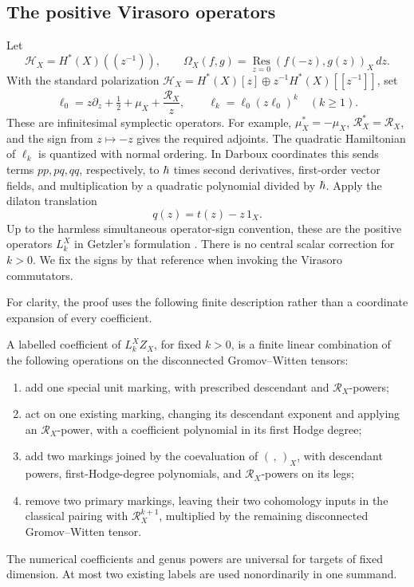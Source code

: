\subsection{The positive Virasoro operators}

Let
\[
 \mathcal H_X=H^*(X)((z^{-1})),\qquad
 \Omega_X(f,g)=\operatorname*{Res}_{z=0}(f(-z),g(z))_X\,dz.
\]
With the standard polarization
\(\mathcal H_X=H^*(X)[z]\oplus z^{-1}H^*(X)[[z^{-1}]]\), set
\begin{equation}
 \ell_0=z\partial_z+\tfrac12+\mu_X+\frac{\mathcal R_X}{z},
 \qquad
 \ell_k=\ell_0(z\ell_0)^k\quad(k\geq1).
 \label{eq:loop-operators}
\end{equation}
These are infinitesimal symplectic operators. For example,
\(\mu_X^*=-\mu_X\), \(\mathcal R_X^*=\mathcal R_X\), and the sign from \(z\mapsto-z\) gives the required adjoints. The quadratic Hamiltonian of \(\ell_k\) is quantized with normal ordering. In Darboux coordinates this sends terms \(pp,pq,qq\), respectively, to \(\hbar\) times second derivatives, first-order vector fields, and multiplication by a quadratic polynomial divided by \(\hbar\). Apply the dilaton translation
\[
 q(z)=t(z)-z\,1_X.
\]
Up to the harmless simultaneous operator-sign convention, these are the positive operators \(L_k^X\) in Getzler's formulation \cite[Equation~(1.2)]{Getzler1999}. There is no central scalar correction for \(k>0\). We fix the signs by that reference when invoking the Virasoro commutators.

For clarity, the proof uses the following finite description rather than a coordinate expansion of every coefficient.

\begin{proposition}\label{conv:positive-rule}
A labelled coefficient of \(L_k^XZ_X\), for fixed \(k>0\), is a finite linear combination of the following operations on the disconnected Gromov--Witten tensors:
\begin{enumerate}[label=\textup{(\roman*)}]
\item add one special unit marking, with prescribed descendant and \(\mathcal R_X\)-powers;
\item act on one existing marking, changing its descendant exponent and applying an \(\mathcal R_X\)-power, with a coefficient polynomial in its first Hodge degree;
\item add two markings joined by the coevaluation of \((\, ,\,)_X\), with descendant powers, first-Hodge-degree polynomials, and \(\mathcal R_X\)-powers on its legs;
\item remove two primary markings, leaving their two cohomology inputs in the classical pairing with \(\mathcal R_X^{k+1}\), multiplied by the remaining disconnected Gromov--Witten tensor.
\end{enumerate}
The numerical coefficients and genus powers are universal for targets of fixed dimension. At most two existing labels are used nonordinarily in one summand.
\end{proposition}

